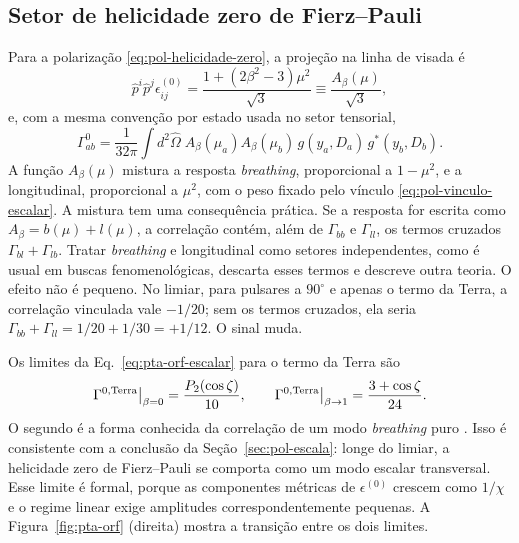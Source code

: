 \subsection{Setor de helicidade zero de Fierz--Pauli}

Para a polarização \eqref{eq:pol-helicidade-zero}, a projeção na linha
de visada é
\begin{equation}
 \hat p^i\hat p^j\epsilon^{(0)}_{ij}
 =\frac{1+(2\beta^2-3)\mu^2}{\sqrt3}
 \equiv\frac{A_\beta(\mu)}{\sqrt3},
 \label{eq:pta-projecao-escalar}
\end{equation}
e, com a mesma convenção por estado usada no setor tensorial,
\begin{equation}
 \Gamma^{0}_{ab}=\frac{1}{32\pi}\int d^2\hat\Omega\;
 A_\beta(\mu_a)A_\beta(\mu_b)\,g(y_a,D_a)\,g^*(y_b,D_b).
 \label{eq:pta-orf-escalar}
\end{equation}
A função $A_\beta(\mu)$ mistura a resposta \emph{breathing}, proporcional
a $1-\mu^2$, e a longitudinal, proporcional a $\mu^2$, com o peso fixado
pelo vínculo \eqref{eq:pol-vinculo-escalar}. A mistura tem uma
consequência prática. Se a resposta for escrita como
$A_\beta=b(\mu)+l(\mu)$, a correlação contém, além de $\Gamma_{bb}$ e
$\Gamma_{ll}$, os termos cruzados $\Gamma_{bl}+\Gamma_{lb}$. Tratar
\emph{breathing} e longitudinal como setores independentes, como é usual
em buscas fenomenológicas, descarta esses termos e descreve outra
teoria. O efeito não é pequeno. No limiar, para pulsares a $90^\circ$ e
apenas o termo da Terra, a correlação vinculada vale $-1/20$; sem os
termos cruzados, ela seria $\Gamma_{bb}+\Gamma_{ll}=1/20+1/30=+1/12$.
O sinal muda.

Os limites da Eq.~\eqref{eq:pta-orf-escalar} para o termo da Terra são
\begin{equation}
 \Gamma^{0,\rm Terra}\big|_{\beta=0}=\frac{P_2(\cos\zeta)}{10},
 \qquad
 \Gamma^{0,\rm Terra}\big|_{\beta\to1}=\frac{3+\cos\zeta}{24}.
 \label{eq:pta-limites-escalar}
\end{equation}
O segundo é a forma conhecida da correlação de um modo \emph{breathing}
puro \autocite{lee2008}. Isso é consistente com a conclusão da
Seção~\ref{sec:pol-escala}: longe do limiar, a helicidade zero de
Fierz--Pauli se comporta como um modo escalar transversal. Esse limite é
formal, porque as componentes métricas de $\epsilon^{(0)}$ crescem como
$1/\chi$ e o regime linear exige amplitudes correspondentemente
pequenas. A Figura~\ref{fig:pta-orf} (direita) mostra a transição entre
os dois limites.

